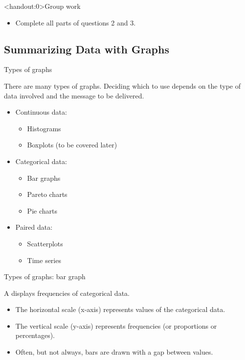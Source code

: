 \documentclass[xcolor=table, aspectratio=169, bigger]{beamer}
\begin{document}
\begin{frame}<handout:0>{Group work}
\begin{block}{}
\begin{itemize}
\item Complete all parts of questions 2 and 3.
\end{itemize}
\end{block}
\end{frame}


%
%
\subsection{Summarizing Data with Graphs}

\begin{frame}{Types of graphs}

\begin{block}{}
There are many types of graphs. Deciding which to use depends on the type of data involved and the message to be delivered.

\begin{itemize}
\item Continuous data:
	\begin{itemize}
	\item Histograms
	\item Boxplots (to be covered later)
	\end{itemize}
\item Categorical data:
	\begin{itemize}
	\item Bar graphs
	\item Pareto charts
	\item Pie charts
	\end{itemize}
\item Paired data:
	\begin{itemize}
	\item Scatterplots
	\item Time series
	\end{itemize}
\end{itemize}
\end{block}
\end{frame}

\begin{frame}{Types of graphs: bar graph}
\begin{block}{}
A  displays frequencies of categorical data.
\begin{itemize}
\item The horizontal scale (x-axis) represents values of the categorical data.
\item The vertical scale (y-axis) represents frequencies (or proportions or percentages).
\item Often, but not always, bars are drawn with a gap between values.
\end{itemize}
\end{block}
\end{frame}
\end{document}
